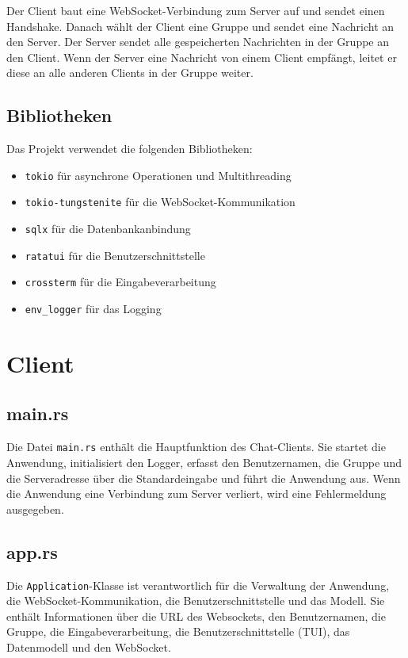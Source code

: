 \documentclass[a4paper]{article}
\begin{document}
Der Client baut eine WebSocket-Verbindung zum Server auf und sendet einen Handshake. Danach wählt der Client eine Gruppe und sendet eine Nachricht an den Server.
Der Server sendet alle gespeicherten Nachrichten in der Gruppe an den Client. Wenn der Server eine Nachricht von einem Client empfängt, leitet er diese an alle anderen Clients in der Gruppe weiter.


\subsection{Bibliotheken}

Das Projekt verwendet die folgenden Bibliotheken:

\begin{itemize}
    \setlength\itemsep{0em}
    \item \texttt{tokio} für asynchrone Operationen und Multithreading
    \item \texttt{tokio-tungstenite} für die WebSocket-Kommunikation
    \item \texttt{sqlx} für die Datenbankanbindung
    \item \texttt{ratatui} für die Benutzerschnittstelle
    \item \texttt{crossterm} für die Eingabeverarbeitung
    \item \texttt{env\_logger} für das Logging
\end{itemize}

\section{Client}

\subsection{main.rs}

Die Datei \texttt{main.rs} enthält die Hauptfunktion des Chat-Clients. Sie startet die Anwendung, initialisiert den Logger, erfasst den Benutzernamen, die Gruppe und die Serveradresse über die Standardeingabe und führt die Anwendung aus. Wenn die Anwendung eine Verbindung zum Server verliert, wird eine Fehlermeldung ausgegeben.

\subsection{app.rs}

Die \texttt{Application}-Klasse ist verantwortlich für die Verwaltung der Anwendung, die WebSocket-Kommunikation, die Benutzerschnittstelle und das Modell. Sie enthält Informationen über die URL des Websockets, den Benutzernamen, die Gruppe, die Eingabeverarbeitung, die Benutzerschnittstelle (TUI), das Datenmodell und den WebSocket.
\end{document}
